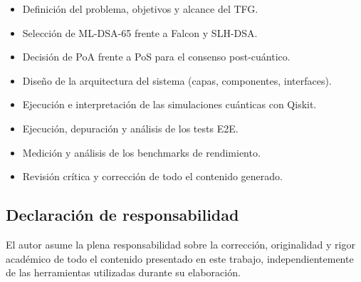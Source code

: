 \begin{itemize}
  \item Definición del problema, objetivos y alcance del TFG.
  \item Selección de ML-DSA-65 frente a Falcon y SLH-DSA.
  \item Decisión de PoA frente a PoS para el consenso post-cuántico.
  \item Diseño de la arquitectura del sistema (capas, componentes, interfaces).
  \item Ejecución e interpretación de las simulaciones cuánticas con Qiskit.
  \item Ejecución, depuración y análisis de los tests E2E.
  \item Medición y análisis de los benchmarks de rendimiento.
  \item Revisión crítica y corrección de todo el contenido generado.
\end{itemize}

\subsection*{Declaración de responsabilidad}

El autor asume la plena responsabilidad sobre la corrección, originalidad y rigor académico de todo el contenido presentado en este trabajo, independientemente de las herramientas utilizadas durante su elaboración.
